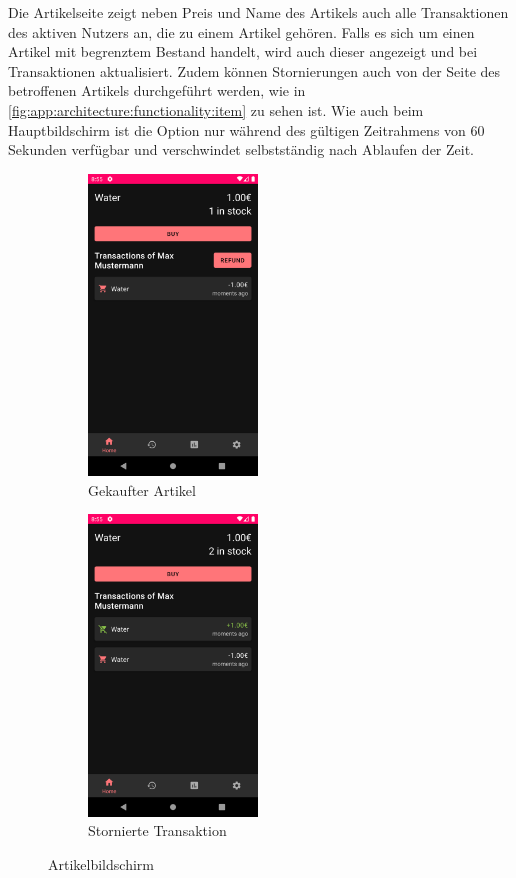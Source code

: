 \documentclass[a4paper, 11pt]{article}
\begin{document}
Die Artikelseite zeigt neben Preis und Name des Artikels auch alle Transaktionen des aktiven Nutzers an, die zu einem Artikel gehören.
Falls es sich um einen Artikel mit begrenztem Bestand handelt, wird auch dieser angezeigt und bei Transaktionen aktualisiert.
Zudem können Stornierungen auch von der Seite des betroffenen Artikels durchgeführt werden, wie in \autoref{fig:app:architecture:functionality:item} zu sehen ist.
Wie auch beim Hauptbildschirm ist die Option nur während des gültigen Zeitrahmens von 60 Sekunden verfügbar und verschwindet selbstständig nach Ablaufen der Zeit.
\begin{figure}[]
	\begin{subfigure}{.5\textwidth}
		\centering
		\includegraphics[height=8cm,keepaspectratio]{./images/screenshots/item-purchased.png}
		\caption{Gekaufter Artikel}
		\label{fig:app:architecture:functionality:item:purchase}
	\end{subfigure}
	\begin{subfigure}{.5\textwidth}
		\centering
		\includegraphics[height=8cm,keepaspectratio]{./images/screenshots/item-refunded.png}
		\caption{Stornierte Transaktion}
		\label{fig:app:architecture:functionality:item:refund}
	\end{subfigure}
	\caption{Artikelbildschirm}
	\label{fig:app:architecture:functionality:item}
\end{figure}
\end{document}
